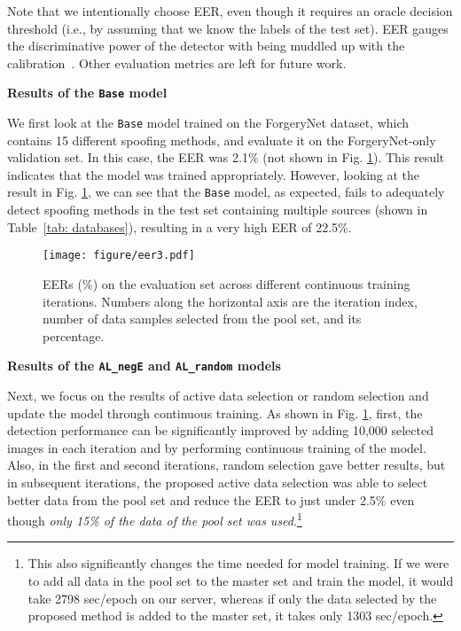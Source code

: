 \documentclass[english]{lni}
\begin{document}
Note that we intentionally choose EER, even though it requires an oracle decision threshold (i.e., by assuming that we know the labels of the test set). EER gauges the discriminative power of the detector with being muddled up with the calibration~\cite{castro2007forensic}. Other evaluation metrics are left for future work.

\noindent
\textbf{Results of the \texttt{Base} model} 

We first look at the \texttt{Base} model trained on the ForgeryNet dataset, which contains 15 different spoofing methods, and evaluate it on the ForgeryNet-only validation set. In this case, the EER was 2.1\% (not shown in Fig. \ref{fig:exp_error}). This result indicates that the model was trained appropriately. However, looking at the result in Fig. \ref{fig:exp_error}, we can see that the \texttt{Base} model, as expected, fails to adequately detect spoofing methods in the test set containing multiple sources (shown in Table~\ref{tab: databases}), resulting in a very high EER of 22.5\%.

\begin{figure}[t!]
\centering
\texttt{[image: figure/eer3.pdf]}
\caption{EERs (\%) on the evaluation set across different continuous training iterations. Numbers along the horizontal axis are the iteration index, number of data samples selected from the pool set, and its percentage.} 
\label{fig:exp_error}
\end{figure}

\noindent
\textbf{Results of the \texttt{AL\_negE} and \texttt{AL\_random} models} 

Next, we focus on the results of active data selection or random selection and update the model through continuous training. As shown in Fig. \ref{fig:exp_error}, first, the detection performance can be significantly improved by adding 10,000 selected images in each iteration and by performing continuous training of the model. Also, in the first and second iterations, random selection gave better results, but in subsequent iterations, the proposed active data selection was able to select better data from the pool set and reduce the EER to just under 2.5\% even though \textit{only 15\% of the data of the pool set was used}.\footnote{This also significantly changes the time needed for model training. If we were to add all data in the pool set to the master set and train the model, it would take 2798 sec/epoch on our server, whereas if only the data selected by the proposed method is added to the master set, it takes only 1303 sec/epoch.}
\end{document}
